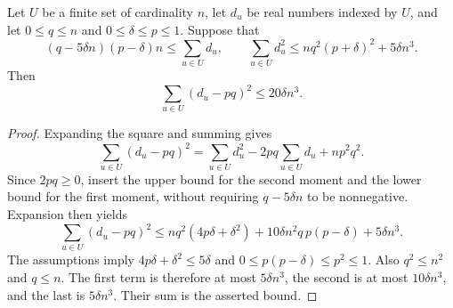 \begin{lemma}
Let $U$ be a finite set of cardinality $n$, let $d_u$ be real numbers indexed by $U$, and let $0\le q\le n$ and $0\le\delta\le p\le1$. Suppose that
\[
 (q-5\delta n)(p-\delta)n\le\sum_{u\in U}d_u,
 \qquad
 \sum_{u\in U}d_u^2\le nq^2(p+\delta)^2+5\delta n^3.
\]
Then
\[
 \sum_{u\in U}(d_u-pq)^2\le20\delta n^3.
\]
\end{lemma}
\begin{proof}
Expanding the square and summing gives
\[
 \sum_{u\in U}(d_u-pq)^2
 =\sum_{u\in U}d_u^2-2pq\sum_{u\in U}d_u+np^2q^2.
\]
Since $2pq\ge0$, insert the upper bound for the second moment and the lower bound for the first moment, without requiring $q-5\delta n$ to be nonnegative. Expansion then yields
\[
 \sum_{u\in U}(d_u-pq)^2
 \le nq^2(4p\delta+\delta^2)
       +10\delta n^2q\,p(p-\delta)+5\delta n^3.
\]
The assumptions imply $4p\delta+\delta^2\le5\delta$ and
$0\le p(p-\delta)\le p^2\le1$. Also $q^2\le n^2$ and $q\le n$.
The first term is therefore at most $5\delta n^3$, the second is at most
$10\delta n^3$, and the last is $5\delta n^3$. Their sum is the asserted bound.
\end{proof}
